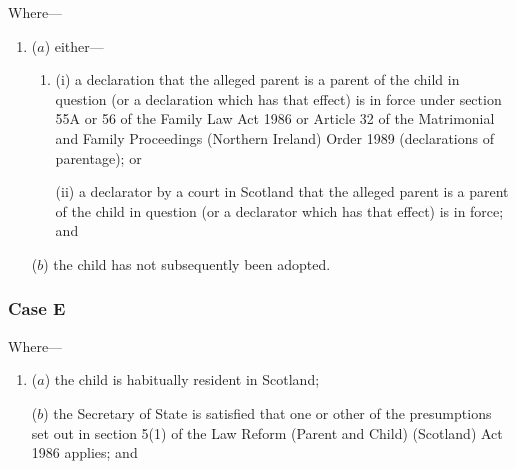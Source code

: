 \documentclass[12pt,a4paper]{article}
\begin{document}
\begin{enumerate}
    Where—
\begin{enumerate}\item[]
    ($a$) 
    either—
\begin{enumerate}\item[]
    (i) 
    a declaration that the alleged parent is a parent of the child in question (or a declaration which has that effect) is in force under section 
55A or  %
56 of the Family Law Act 1986 
or Article 32 of the Matrimonial and Family Proceedings (Northern Ireland) Order 1989  %
(declarations of parentage); or

    (ii) 
    a declarator by a court in Scotland that the alleged parent is a parent of the child in question (or a declarator which has that effect) is in force; and
\end{enumerate}

    ($b$) 
    the child has not subsequently been adopted.
\end{enumerate}

%
%

    \subsubsection*{Case E}

    Where—
\begin{enumerate}\item[]
    ($a$) 
    the child is habitually resident in Scotland;

    ($b$) 
the 
Secretary of State  %
is satisfied that one or other of the presumptions set out in section 5(1)  of the Law Reform (Parent and Child) (Scotland) Act 1986 applies; and


\end{enumerate}
\end{enumerate}
\end{document}
